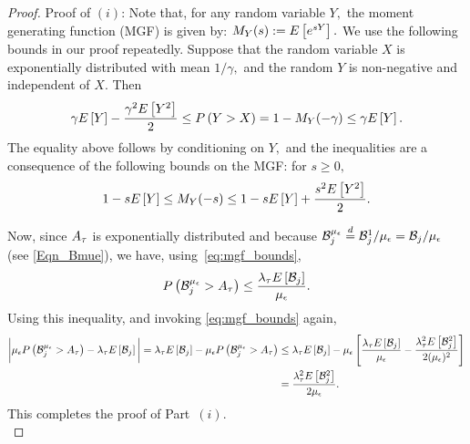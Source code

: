 \begin{proof} %
  Proof of $(i)$: Note that, for any random variable $Y,$ the moment
  generating function (MGF) is given by: $M_Y(s) := E\left[e^{sY}\right].$ We
  use the following bounds in our proof repeatedly. Suppose that the
  random variable $X$ is exponentially distributed with mean
  $1/\gamma,$ and the random $Y$ is non-negative and independent of
  $X.$ Then
  \begin{equation}
    \label{eq:mgf_bounds}
    \gamma E\left[Y\right] - \frac{\gamma^2 E\left[Y^2\right]}{2} \leq P\left(Y > X\right) = 1-M_Y(-\gamma) \leq \gamma E\left[Y\right].
  \end{equation}
  The equality above follows by conditioning on $Y,$ and the
  inequalities are a consequence of the following bounds on the MGF:
  for $s \geq 0,$
  $$1-s E\left[Y\right] \leq M_Y(-s) \leq 1-s E\left[Y\right] + \frac{s^2
    E\left[Y^2\right]}{2}.$$

  
  Now, since $A_{\tau}$ is exponentially distributed and because  
  $\mathcal{B}_j^{\mu_{ \epsilon }} \stackrel{d}{=} \mathcal{B}_j^1/\mu_{{ \epsilon }} = \mathcal{B}_j /\mu_{{ \epsilon }}$  (see \eqref{Eqn_Bmue}), we
  have, using~\eqref{eq:mgf_bounds},
	\begin{align*}
          P\left(\mathcal{B}^{{\mu_\epsilon}}_j > A_{\tau}\right) \leq
          \frac{\lambda_{\tau} E\left[\mathcal{B}_j\right]}{{\mu_\epsilon}}. 
	\end{align*}
	Using this inequality, and invoking \eqref{eq:mgf_bounds} again,   
        {\small\begin{align*} \bigg|{\mu_\epsilon}
            P\left(\mathcal{B}^{{\mu_\epsilon}}_j > A_{\tau}\right) - \lambda_{\tau} E\left[\mathcal{B}_j\right]\bigg|
            =
	\lambda_{\tau} E\left[\mathcal{B}_j\right] - {\mu_\epsilon} P\left(\mathcal{B}^{{\mu_\epsilon}}_j > A_{\tau}\right) 
	& \leq \lambda_{\tau} E\left[\mathcal{B}_j\right] - {\mu_\epsilon}
	\left[\frac{\lambda_{\tau} E\left[\mathcal{B}_j\right]}{{\mu_\epsilon}} -
	\frac{\lambda_{{\tau}}^2 E\left[\mathcal{B}^2_j\right]}{2 ({\mu_\epsilon})^2} \right] \\
	&=\frac{\lambda_{{\tau}}^2E\left[\mathcal{B}^2_j\right]}{2{\mu_\epsilon}}.
               \end{align*}}
             This completes the proof of Part~$(i)$. \\
	

\end{proof}
